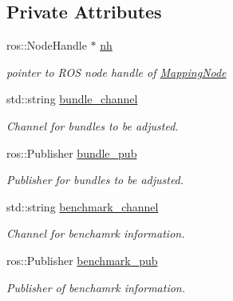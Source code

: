 \subsection*{Private Attributes}
\begin{DoxyCompactItemize}
\item 
\mbox{\label{classMap_a4bf0c12711369ea6ca8da6d1f1b2ad2f}} 
ros\+::\+Node\+Handle $\ast$ \hyperlink{classMap_a4bf0c12711369ea6ca8da6d1f1b2ad2f}{nh}
\begin{DoxyCompactList}\small\item\em pointer to R\+OS node handle of \hyperlink{classMappingNode}{Mapping\+Node} \end{DoxyCompactList}\item 
\mbox{\label{classMap_ace0707010dc9f99268170b69b1a390e7}} 
std\+::string \hyperlink{classMap_ace0707010dc9f99268170b69b1a390e7}{bundle\+\_\+channel}
\begin{DoxyCompactList}\small\item\em Channel for bundles to be adjusted. \end{DoxyCompactList}\item 
\mbox{\label{classMap_a19f0dddf99a284cffef5c1119bc4dde4}} 
ros\+::\+Publisher \hyperlink{classMap_a19f0dddf99a284cffef5c1119bc4dde4}{bundle\+\_\+pub}
\begin{DoxyCompactList}\small\item\em Publisher for bundles to be adjusted. \end{DoxyCompactList}\item 
\mbox{\label{classMap_a89c73a3c3de88c3656ded53b7ff28c4f}} 
std\+::string \hyperlink{classMap_a89c73a3c3de88c3656ded53b7ff28c4f}{benchmark\+\_\+channel}
\begin{DoxyCompactList}\small\item\em Channel for benchamrk information. \end{DoxyCompactList}\item 
\mbox{\label{classMap_a96dea5fd8286b76a01685e97c0972002}} 
ros\+::\+Publisher \hyperlink{classMap_a96dea5fd8286b76a01685e97c0972002}{benchmark\+\_\+pub}
\begin{DoxyCompactList}\small\item\em Publisher of benchamrk information. \end{DoxyCompactList}\item 

\end{DoxyCompactItemize}
